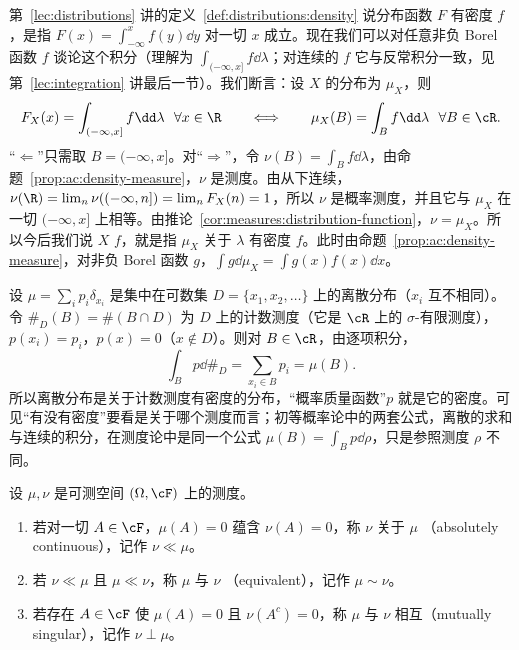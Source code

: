 \begin{example}[有密度的分布]\label{ex:ac:density}
第~\ref{lec:distributions} 讲的定义~\ref{def:distributions:density} 说分布函数 $F$ 有密度 $f$，是指 $F(x)=\int_{-\infty}^xf(y)\dd y$ 对一切 $x$ 成立。现在我们可以对任意非负 Borel 函数 $f$ 谈论这个积分（理解为 $\int_{(-\infty,x]}f\dd\lambda$；对连续的 $f$ 它与反常积分一致，见第~\ref{lec:integration} 讲最后一节）。我们断言：设 $X$ 的分布为 $\mu_X$，则
\[
F_X(x)=\int_{(-\infty,x]}f\dd\lambda\ \ \forall x\in\R\qquad\Longleftrightarrow\qquad\mu_X(B)=\int_Bf\dd\lambda\ \ \forall B\in\cR .
\]
“$\Leftarrow$”只需取 $B=(-\infty,x]$。对“$\Rightarrow$”，令 $\nu(B)=\int_Bf\dd\lambda$，由命题~\ref{prop:ac:density-measure}，$\nu$ 是测度。由从下连续，$\nu(\R)=\lim_n\nu((-\infty,n])=\lim_nF_X(n)=1$，所以 $\nu$ 是概率测度，并且它与 $\mu_X$ 在一切 $(-\infty,x]$ 上相等。由推论~\ref{cor:measures:distribution-function}，$\nu=\mu_X$。所以今后我们说 $X$  $f$，就是指 $\mu_X$ 关于 $\lambda$ 有密度 $f$。此时由命题~\ref{prop:ac:density-measure}，对非负 Borel 函数 $g$，$\int g\dd\mu_X=\int g(x)f(x)\dd x$。
\end{example}

\begin{example}[离散分布也是有密度的分布]
设 $\mu=\sum_ip_i\delta_{x_i}$ 是集中在可数集 $D=\{x_1,x_2,\dots\}$ 上的离散分布（$x_i$ 互不相同）。令 $\#_D(B)=\#(B\cap D)$ 为 $D$ 上的计数测度（它是 $\cR$ 上的 $\sigma$-有限测度），$p(x_i)=p_i$，$p(x)=0$（$x\notin D$）。则对 $B\in\cR$，由逐项积分，
\[
\int_Bp\dd\#_D=\sum_{x_i\in B}p_i=\mu(B).
\]
所以离散分布是关于计数测度有密度的分布，“概率质量函数”$p$ 就是它的密度。可见“有没有密度”要看是关于哪个测度而言；初等概率论中的两套公式，离散的求和与连续的积分，在测度论中是同一个公式 $\mu(B)=\int_Bp\dd\rho$，只是参照测度 $\rho$ 不同。
\end{example}


\begin{definition}[绝对连续，奇异]\label{def:ac:ac-singular}
设 $\mu,\nu$ 是可测空间 $(\Omega,\cF)$ 上的测度。
\begin{enumerate}
\item 若对一切 $A\in\cF$，$\mu(A)=0$ 蕴含 $\nu(A)=0$，称 $\nu$ 关于 $\mu$ （absolutely continuous），记作 $\nu\ll\mu$。
\item 若 $\nu\ll\mu$ 且 $\mu\ll\nu$，称 $\mu$ 与 $\nu$ （equivalent），记作 $\mu\sim\nu$。
\item 若存在 $A\in\cF$ 使 $\mu(A)=0$ 且 $\nu(A^c)=0$，称 $\mu$ 与 $\nu$ 相互（mutually singular），记作 $\nu\perp\mu$。
\end{enumerate}
\end{definition}

